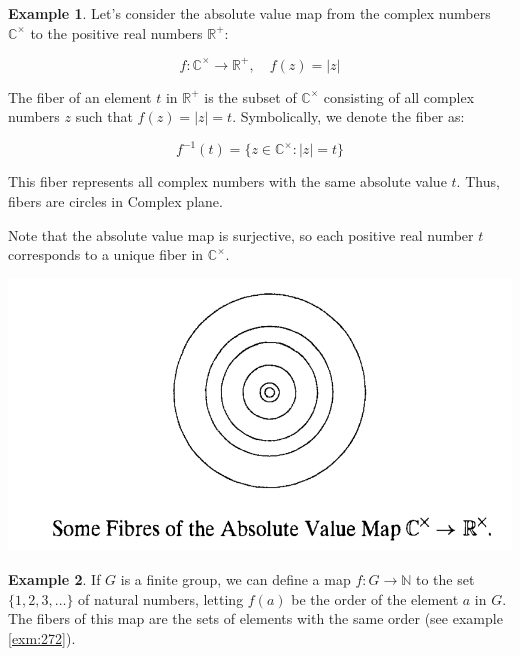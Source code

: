 \documentclass[
]{book}
\theoremstyle{definition}
\theoremstyle{definition}
\newtheorem{example}{Example}[chapter]
\theoremstyle{definition}
\theoremstyle{definition}
\theoremstyle{remark}
\begin{document}
\begin{example}
\protect\hypertarget{exm:unnamed-chunk-39}{}\label{exm:unnamed-chunk-39}Let's consider the absolute value map from the complex numbers \(\mathbb{C}^\times\) to the positive real numbers \(\mathbb{R}^+\):

\[ f: \mathbb{C}^\times \to \mathbb{R}^+, \quad f(z) = |z| \]

The fiber of an element \(t\) in \(\mathbb{R}^+\) is the subset of \(\mathbb{C}^\times\) consisting of all complex numbers \(z\) such that \(f(z) = |z| = t\). Symbolically, we denote the fiber as:

\[ f^{-1}(t) = \{ z \in \mathbb{C}^\times : |z| = t \} \]

This fiber represents all complex numbers with the same absolute value \(t\). Thus, fibers are circles in Complex plane.

Note that the absolute value map is surjective, so each positive real number \(t\) corresponds to a unique fiber in \(\mathbb{C}^\times\).
\end{example}

\includegraphics{figures/ch_2/fig33.png}

\begin{example}
\protect\hypertarget{exm:unnamed-chunk-40}{}\label{exm:unnamed-chunk-40}If \(G\) is a finite group, we can define a map \(f : G \to \mathbb{N}\) to the set \(\{1, 2, 3, \ldots\}\) of natural numbers, letting \(f(a)\) be the order of the element \(a\) in \(G\). The fibers of this map are the sets of elements with the same order (see example \ref{exm:272}).
\end{example}
\end{document}
